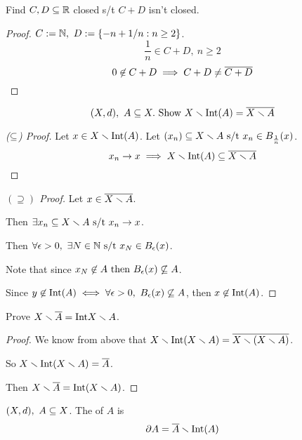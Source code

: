 \documentclass[12pt]{article}
\begin{document}
\bboxexam
\begin{exam}
    Find \(C,D\subseteq \mathbb R\) closed s/t \(C+D\) isn't closed.
    \bboxproof
    \begin{proof}
        \(C:=\mathbb N,\ D:=\{-n+1/n : n\ge 2\}\).
        \[
            \frac1n\in C+D,\ n\ge 2
        \]
        \[
            0\not\in C+D\implies C+D\neq\overline{C+D}
        \]
    \end{proof}
    \ebox
\end{exam}
\ebox


\bboxexam
\begin{exam}
    \[
        (X,d),\ A\ssq X.\ \TR{Show}\ 
        X\smin\interior(A)=\cls{X\smin A}
    \]
    \bboxproof
    \begin{proof}[(\(\subseteq\)) Proof]
        Let \(x\in X\smallsetminus\mathrm{Int}(A)\).
        Let \((x_n)\subseteq X\smallsetminus A\text{ s/t } x_n\in B_{\frac1n}(x)\).
        \[
            x_n\to x\implies X\smallsetminus\mathrm{Int}(A)\subseteq \overline{X\smallsetminus A}
        \]
    \end{proof}
    \ebox

    \bboxproof
    \begin{proof}[\((\supseteq)\) Proof]
        Let \(x\in\overline{X\smallsetminus A}\).

        Then \(\exists x_n\subseteq X\smallsetminus A\text{ s/t } x_n\to x\).

        Then \(\forall\epsilon>0,\ \exists N\in\mathbb N\text{ s/t } x_N\in B_\epsilon(x)\).

        Note that since \(x_N\not\in A\ \tthen\ B_\e(x)\not\ssq A\).

        Since \(y\not\in\interior(A)\iff\forall\e>0,\ B_\e(x)\not\ssq A\),
        then \(x\not\in\mathrm{Int}(A)\).
    \end{proof}
    \ebox
\end{exam}
\ebox


\bboxexam
\begin{exam}
    Prove \(X\smallsetminus\overline{A} = \mathrm{Int}{X \smallsetminus A}\).
    \bboxproof
    \begin{proof}
        We know from above that \(X\smallsetminus\mathrm{Int}(X\smallsetminus A)
        = \overline{X\smallsetminus(X\smallsetminus A)}\).

        So \(X\smallsetminus\mathrm{Int}(X\smallsetminus A) = \overline{A}\).

        Then \(X\smallsetminus \overline{A} = \mathrm{Int}(X\smallsetminus A)\).
    \end{proof}
    \ebox
\end{exam}
\ebox

\bboxdefn
\begin{defn}[Boundary]
    \((X,d),\ A\subseteq X\). The  of \(A\) is
    \[
        \partial A=\overline{A}\smallsetminus\mathrm{Int}(A)
    \]
\end{defn}
\ebox
\end{document}
